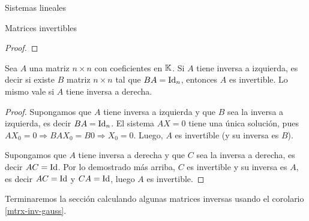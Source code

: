 \begin{chapter}{Sistemas lineales}
\begin{section}{Matrices invertibles}
\begin{proof}
            \end{proof}
            
            \begin{corolario}
                Sea $A$ una matriz $n \times n$ con coeficientes  en $\mathbb K$. Si $A$ tiene inversa a izquierda,  es decir si existe $B$ matriz $n \times n$ tal que $BA=\operatorname{Id}_n$,   entonces $A$ es invertible.  Lo mismo vale si $A$ tiene inversa a derecha. 
            \end{corolario}	
            \begin{proof}
                Supongamos que  $A$ tiene inversa a izquierda y  que $B$ sea la inversa a izquierda,  es decir $BA=\operatorname{Id}_n$. El sistema $AX=0$ tiene una única solución, pues $AX_0=0 \Rightarrow BAX_0=B0 \Rightarrow X_0=0$. Luego, $A$  es invertible (y su inversa es $B$). 
                
                Supongamos que  $A$ tiene inversa a derecha y  que $C$ sea la inversa a derecha, es decir $AC=\operatorname{Id}$. Por lo demostrado más arriba, $C$ es invertible y su inversa es $A$, es decir $AC=\operatorname{Id}$ y $CA=\operatorname{Id}$, luego $A$  es invertible. 
            \end{proof}	
            
            
            
            Terminaremos la  sección calculando algunas matrices inversas usando el corolario  \ref{mtrx-inv-gauss}. 
            

\end{section}
\end{chapter}
